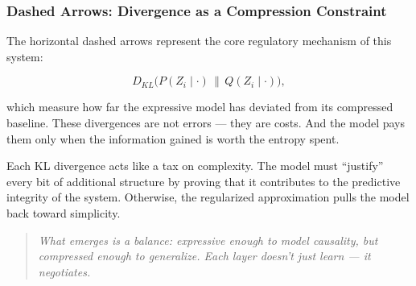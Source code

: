 \subsubsection{Dashed Arrows: Divergence as a Compression Constraint}

The horizontal dashed arrows represent the core regulatory mechanism of this system:

\[
D_{KL}\big(P(Z_i \mid \cdot) \, \| \, Q(Z_i \mid \cdot)\big),
\]

which measure how far the expressive model has deviated from its compressed baseline. These divergences are not errors — they are costs. And the model pays them only when the information gained is worth the entropy spent.

Each KL divergence acts like a tax on complexity. The model must “justify” every bit of additional structure by proving that it contributes to the predictive integrity of the system. Otherwise, the regularized approximation pulls the model back toward simplicity.

\begin{quote}
\textit{What emerges is a balance: expressive enough to model causality, but compressed enough to generalize. Each layer doesn't just learn — it negotiates.}
\end{quote}



